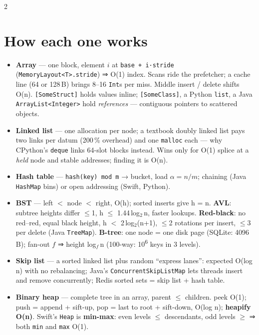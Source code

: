 \documentclass[8pt]{extarticle}
\newcommand\ct[1]{\texttt{#1}}
\begin{document}
\begin{multicols}{2}
\raggedright
\footnotesize{}

\section{How each one works}
\begin{itemize}
  \item \textbf{Array} — one block, element $i$ at \ct{base + i·stride}
        (\ct{MemoryLayout<T>.stride}) ⇒ O(1) index. Scans ride the prefetcher; a
        cache line (64 or 128\,B) brings 8–16 \ct{Int}s per miss. Middle insert /
        delete shifts O(n). \ct{[SomeStruct]} holds values inline; \ct{[SomeClass]},
        a Python \ct{list}, a Java \ct{ArrayList<Integer>} hold \emph{references} —
        contiguous pointers to scattered objects.
  \item \textbf{Linked list} — one allocation per node; a textbook doubly linked
        list pays two links per datum (200\,\% overhead) and one \ct{malloc} each —
        why CPython's \ct{deque} links 64-slot blocks instead. Wins only for O(1)
        splice at a \emph{held} node and stable addresses; finding it is O(n).
  \item \textbf{Hash table} — \ct{hash(key) mod m} → bucket, load $\alpha = n/m$;
        chaining (Java \ct{HashMap} bins) or open addressing (Swift, Python).
  \item \textbf{BST} — left $<$ node $<$ right, O(h); sorted inserts give h = n.
        \textbf{AVL}: subtree heights differ $\le$1, h $\le$ 1.44\,log$_2$\,n,
        faster lookups. \textbf{Red-black}: no red–red, equal black height,
        h $<$ 2\,log$_2$(n+1), $\le$2 rotations per insert, $\le$3 per delete (Java
        \ct{TreeMap}). \textbf{B-tree}: one node = one disk page (SQLite: 4096\,B);
        fan-out $f$ ⇒ height log$_f$\,n (100-way: 10\textsuperscript{6} keys in 3 levels).
  \item \textbf{Skip list} — a sorted linked list plus random ``express lanes'':
        expected O(log n) with no rebalancing; Java's \ct{ConcurrentSkipListMap}
        lets threads insert and remove concurrently; Redis sorted sets = skip list +
        hash table.
  \item \textbf{Binary heap} — complete tree in an array, parent $\le$ children.
        peek O(1); push = append + sift-up, pop = last to root + sift-down, O(log n);
        \textbf{heapify O(n)}. Swift's \ct{Heap} is \textbf{min-max}: even levels
        $\le$ descendants, odd levels $\ge$ ⇒ both \ct{min} and \ct{max} O(1).

\end{itemize}
\end{multicols}
\end{document}
